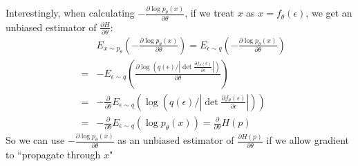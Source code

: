 \documentclass{article}
\newcommand{\pian}[2]{\frac{\partial #1}{\partial #2}}
\begin{document}
Interestingly, when calculating $-\pian{\log p_\theta(x)}{\theta}$, if we treat $x$ as $x=f_\theta(\epsilon)$, we get an unbiased estimator of $\pian{H}{\theta}$:
\begin{eqnarray*}
&& E_{x\sim p_\theta}\left(-\pian{\log p_\theta(x)}{\theta}\right) = E_{\epsilon \sim q}\left(-\pian{\log p_\theta(x)}{\theta}\right) \\
&=& -E_{\epsilon \sim q}\left(\pian{\log\left( q(\epsilon)/\left|\det\pian{f_\theta(\epsilon)}{\epsilon}\right|\right)}{\theta}\right) \\
&=& -\pian{}{\theta}E_{\epsilon \sim q}\left(\log\left( q(\epsilon)/\left|\det\pian{f_\theta(\epsilon)}{\epsilon}\right|\right)\right) \\
&=& -\pian{}{\theta}E_{\epsilon \sim q}\left(\log p_\theta(x)\right) = \pian{}{\theta}H(p)
\end{eqnarray*}
So we can use $-\pian{\log p_\theta(x)}{\theta}$ as an unbiased estimator of $\pian{H(p)}{\theta}$ if we allow gradient to ``propagate through $x$"
\end{document}
